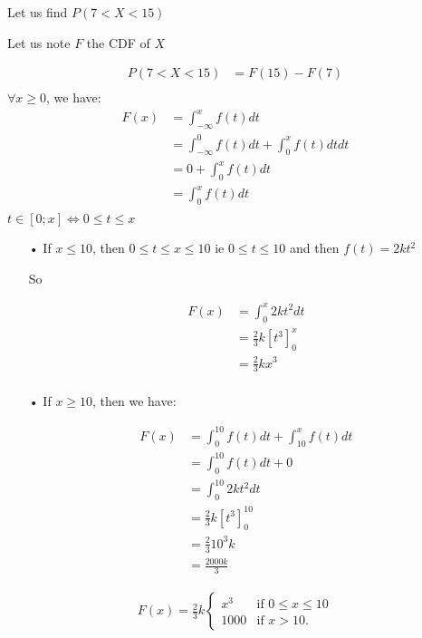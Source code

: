 \documentclass[11pt]{article}
\def\gt{>}
\def\lt{<}
\begin{document}
Let us find $P(7 \lt X \lt 15)$

Let us note $F$ the CDF of $X$

\begin{align*}
P(7 \lt X \lt 15) &= F(15)-F(7) \\
\end{align*}
$\forall x\ge 0 $, we have:
\begin{align*}
F(x) &=\int_\mathbb{-\infty}^x f(t)dt\\
&=\int_{-\infty}^{0} f(t)dt+ \int_0^{x} f(t)dtdt\\
				  &=0+ \int_0^{x} f(t)dt\\
				  &=\int_0^{x} f(t)dt\\
\end{align*}
$t \in \left[0 ; x\right] \iff 0 \le t \le x$

\begin{itemize}
\item[•] If $x \le 10$, then $0 \le t \le x \le 10$ ie $0 \le t \le 10$ and then $f(t)=2kt^2$

So 

\begin{align*}
F(x) &=\int_{0}^x 2kt^2dt\\
&=\frac{2}{3}k\left[t^3\right]_0^x \\
&=\frac{2}{3}kx^3 \\
\end{align*}

\item[•] If $x \ge 10$, then we have:

\begin{align*}
F(x) &=\int_{0}^{10} f(t)dt+\int_{10}^x f(t)dt\\
&=\int_{0}^{10} f(t)dt+0\\
&=\int_{0}^{10} 2kt^2dt \\
&=\frac{2}{3}k\left[t^3\right]_0^{10} \\
&=\frac{2}{3} 10^3 k \\
&=\frac{2000k}{3}
\end{align*}

\end{itemize}

\begin{align*}
F(x) = \frac{2}{3}k\begin{cases}
            x^3 & \text{if } 0 \leq x \leq 10 \\
            1000 & \text{if } x \gt 10.
        \end{cases}
\end{align*}
\end{document}
